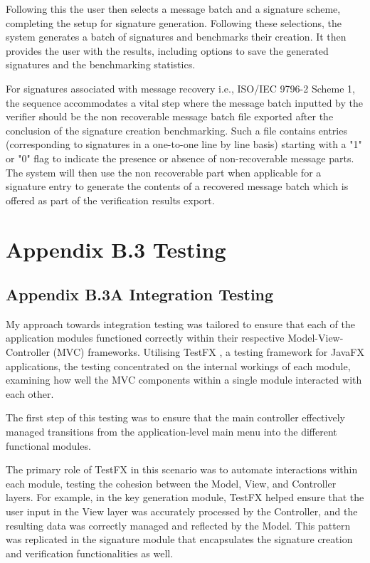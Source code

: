 \documentclass[]{final_report}
\theoremstyle{definition}
\begin{document}
Following this the user then selects a message batch and a signature scheme, completing the setup for signature generation. Following these selections, the system generates a batch of signatures and benchmarks their creation. It then provides the user with the results, including options to save the generated signatures and the benchmarking statistics. 

For signatures associated with message recovery i.e., ISO/IEC 9796-2 Scheme 1, the sequence accommodates a vital step where the message batch inputted by the verifier should be the non recoverable message batch file exported after the conclusion of the signature creation benchmarking. Such a file contains entries (corresponding to signatures in a one-to-one line by line basis) starting with a "1" or "0" flag to indicate the presence or absence of non-recoverable message parts. The system will then use the non recoverable part when applicable for a signature entry to generate the contents of a recovered message batch which is offered as part of the verification results export.





 

\section{Appendix B.3 Testing}

\subsection{Appendix B.3A Integration Testing}
My approach towards integration testing was tailored to ensure that each of the application modules functioned correctly within their respective Model-View-Controller (MVC) frameworks. Utilising TestFX \cite{TestFX2023}, a testing framework for JavaFX applications, the testing concentrated on the internal workings of each module, examining how well the MVC components within a single module interacted with each other.

The first step of this testing was to ensure that the main controller effectively managed transitions from the application-level main menu into the different functional modules. 

The primary role of TestFX in this scenario was to automate interactions within each module, testing the cohesion between the Model, View, and Controller layers. For example, in the key generation module, TestFX helped ensure that the user input in the View layer was accurately processed by the Controller, and the resulting data was correctly managed and reflected by the Model. This pattern was replicated in the signature module that encapsulates the signature creation and verification functionalities as well.
\end{document}
